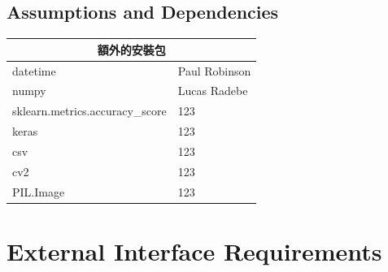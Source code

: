 \documentclass{scrreprt}
\begin{document}
\begin{CJK}{UTF8}{bkai}
\section{Assumptions and Dependencies}
\begin{tabular}{ |l|l| }
    \hline
    \multicolumn{2}{|c|}{額外的安裝包} \\
    \hline
    datetime & Paul Robinson \\
    \hline
    numpy & Lucas Radebe \\
    \hline
    sklearn.metrics.accuracy_score & 123 \\
    \hline
    keras & 123 \\
    \hline
    csv & 123 \\
    \hline
    cv2 & 123 \\
    \hline
    PIL.Image & 123 \\
\end{tabular}

\chapter{External Interface Requirements}


\end{CJK}
\end{document}
